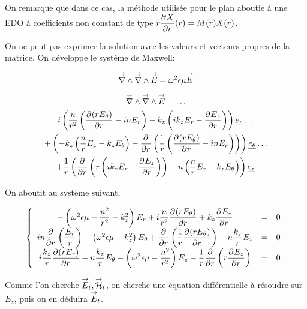 On remarque que dans ce cas, la méthode utilisée pour le plan aboutie à une EDO à coefficients non constant de type $r\ddr{r}{X}(r) = M(r)X(r)$.



On ne peut pas exprimer la solution avec les valeurs et vecteurs propres de la matrice. 
On développe le système de Maxwell:

\begin{equation}
    \vrot \vrot \vE = \w^2\eps\mu \vE
\end{equation}

\begin{multline}
    \vrot \vrot \vE = \dots\\
    i\left(\frac{n}{r^2}\left(\ddr{r}{(rE_\theta)} - inE_r\right) - k_z\left(ik_zE_r - \ddr{r}{E_z}\right)\right)    \v{e_r} \dots\\ 
    + \left(-k_z\left(\frac{n}{r}E_z - k_zE_\theta\right) -\ddr{r}{}\left(\frac{1}{r}\left(\ddr{r}{(rE_\theta)}-inE_r\right)\right)\right)    \v{e_\theta} \dots\\
    + \frac{1}{r}\left(\ddr{r}{} \left(r\left(ik_zE_r - \ddr{r}{E_z}\right)\right) + n \left(\frac{n}{r}E_z - k_zE_\theta\right)\right) \v{e_z}
\end{multline}

On aboutit au système suivant,

\begin{equation}
    \left\lbrace
    \begin{array}{ccc}
        -\left(\w^2\eps\mu -\frac{n^2}{r^2}  - k_z^2\right)E_r  +i\frac{n}{r^2}\ddr{r}{(rE_\theta)}  +k_z\ddr{r}{E_z} & = & 0\\
        in\ddr{r}{}\left(\frac{E_r}{r}\right) -\left(\w^2\eps\mu - k_z^2\right)E_\theta + \ddr{r}{}\left(\frac{1}{r}\ddr{r}{(rE_\theta)}\right)  - n\frac{k_z}{r}E_z & = & 0\\
        i\frac{k_z}{r}\ddr{r}{(rE_r)}  - n\frac{k_z}{r}E_\theta  -\left(\w^2\eps\mu - \frac{n^2}{r^2} \right)E_z - \frac{1}{r}\ddr{r}{}\left(r\ddr{r}{E_z}\right) & = & 0
    \end{array}
    \right.
\end{equation}

Comme l'on cherche $\vE_t, \vH_t$, on cherche une équation différentielle à résoudre sur $E_z$, puis on en déduira $\vE_t$.

